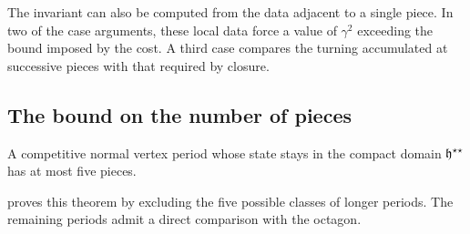 The invariant can also be computed from the data adjacent to a single piece. In two of the case
arguments, these local data force a value of $\gamma^2$ exceeding the bound imposed by the cost. A
third case compares the turning accumulated at successive pieces with that required by closure.

\subsection{The bound on the number of pieces}\label{sec:outline-five}

\begin{theorem}\label{thm:at-most-five}
A competitive normal vertex period whose state stays in the compact domain $\mathfrak{h}^{\star\star}$ has at
most five pieces.
\end{theorem}

 proves this theorem by excluding the five possible classes of longer
periods. The remaining periods admit a direct comparison with the octagon.